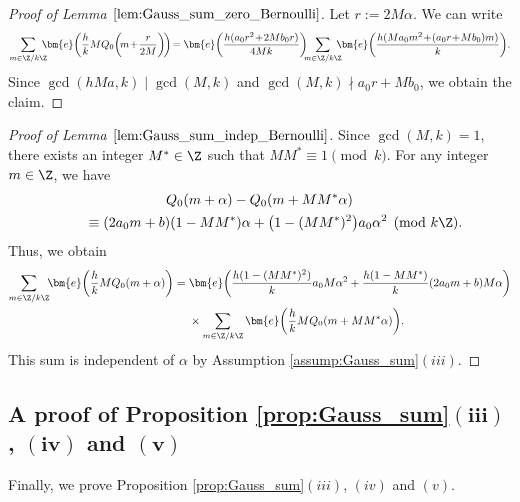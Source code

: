 \begin{proof}[Proof of Lemma $ \ref{lem:Gauss_sum_zero_Bernoulli} $]
	Let $ r := 2M\alpha $.
	We can write
	\begin{gather*}
	\sum_{m \in \Z/k\Z}\!\!\!\! \bm{e}\bigg( \frac{h}{k} M Q_0 \bigg(\!m \!+\! \frac{r}{2M} \bigg) \!\bigg)
\!= \bm{e}\bigg( \frac{h(a_0 r^2 \!+\! 2M b_0r)}{4Mk} \bigg)
\!\!\!	\sum_{m \in \Z/k\Z}\!\!\!\! \bm{e}\bigg( \frac{h(Ma_0 m^2 \!+\! (a_0r \!+\! Mb_0)m)}{k} \bigg).
	\end{gather*}
	Since $ \gcd(hMa, k) \mid \gcd(M, k) $ and $ \gcd(M, k) \nmid a_0 r + Mb_0 $, we obtain the claim.
\end{proof}

\begin{proof}[Proof of Lemma $ \ref{lem:Gauss_sum_indep_Bernoulli} $]
Since $ \gcd(M, k) = 1 $, there exists an integer $ M^* \in \Z $ such that $ MM^* \equiv 1 \pmod k $.
	For any integer $ m \in \Z $, we have
	\begin{gather*}
	Q_0 ( m + \alpha ) - Q_0 ( m + MM^* \alpha )
\\ \qquad
	{}	\equiv (2a_0 m + b)(1 - M M^*) \alpha + \big(1 - (MM^*)^2\big) a_0 \alpha^2 \pmod{k\Z}.
	\end{gather*}
	Thus, we obtain
	\begin{align*}
		\sum_{m \in \Z/k\Z}\!\! \bm{e}\bigg( \frac{h}{k} M Q_0 (m + \alpha ) \bigg)
		= {}
		&\bm{e}\bigg( \frac{h(1 - (MM^*)^2)}{k} a_0 M \alpha^2 + \frac{h(1 - M M^*)}{k} (2a_0 m + b) M
\alpha \bigg)
\\
		&\times \sum_{m \in \Z/k\Z} \bm{e}\bigg( \frac{h}{k} M Q_0 (m + MM^* \alpha ) \bigg).
	\end{align*}
	This sum is independent of $ \alpha $ by Assumption \ref{assump:Gauss_sum}$(iii)$.
\end{proof}

\subsection[A proof of Proposition 4.2(iii), (iv) and (v)]
{A proof of Proposition \ref{prop:Gauss_sum}$\boldsymbol{(iii)}$, $\boldsymbol{(iv)}$ and $\boldsymbol{(v)}$} %

Finally, we prove Proposition \ref{prop:Gauss_sum}$(iii)$, $(iv)$ and $(v)$.

